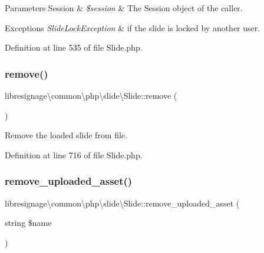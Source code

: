 \begin{DoxyParams}[1]{Parameters}
Session & {\em \$session} & The Session object of the caller. \\
\hline
\end{DoxyParams}

\begin{DoxyExceptions}{Exceptions}
{\em Slide\+Lock\+Exception} & if the slide is locked by another user. \\
\hline
\end{DoxyExceptions}


Definition at line 535 of file Slide.\+php.

\mbox{\label{classlibresignage_1_1common_1_1php_1_1slide_1_1Slide_a2aafb685a415694294a30a0f13114e5a}} 
\subsubsection{\texorpdfstring{remove()}{remove()}}
{\footnotesize\ttfamily libresignage\textbackslash{}common\textbackslash{}php\textbackslash{}slide\textbackslash{}\+Slide\+::remove (\begin{DoxyParamCaption}{ }\end{DoxyParamCaption})}

Remove the loaded slide from file. 

Definition at line 716 of file Slide.\+php.

\mbox{\label{classlibresignage_1_1common_1_1php_1_1slide_1_1Slide_a571c25b85b2e7aeae3fecc99ec3f3ede}} 
\subsubsection{\texorpdfstring{remove\+\_\+uploaded\+\_\+asset()}{remove\_uploaded\_asset()}}
{\footnotesize\ttfamily libresignage\textbackslash{}common\textbackslash{}php\textbackslash{}slide\textbackslash{}\+Slide\+::remove\+\_\+uploaded\+\_\+asset (\begin{DoxyParamCaption}\item[{string}]{\$name }\end{DoxyParamCaption})}

